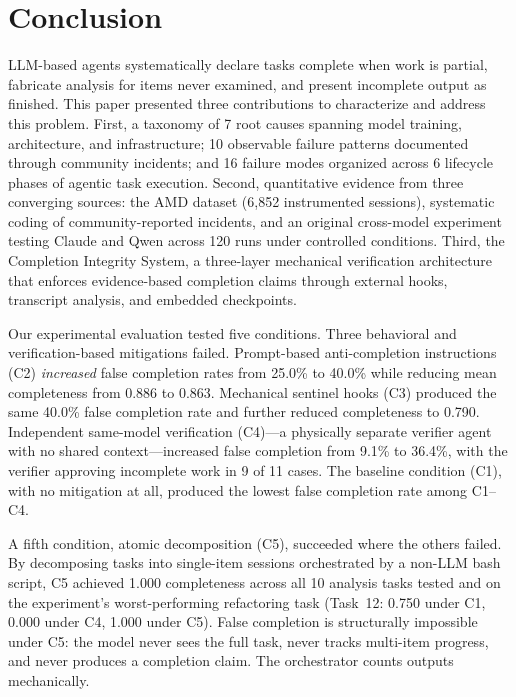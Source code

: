 \section{Conclusion}
\label{sec:conclusion}

LLM-based agents systematically declare tasks complete when work is partial, fabricate analysis for items never examined, and present incomplete output as finished.
This paper presented three contributions to characterize and address this problem.
First, a taxonomy of 7 root causes spanning model training, architecture, and infrastructure; 10 observable failure patterns documented through community incidents; and 16 failure modes organized across 6 lifecycle phases of agentic task execution.
Second, quantitative evidence from three converging sources: the AMD dataset (6,852 instrumented sessions), systematic coding of community-reported incidents, and an original cross-model experiment testing Claude and Qwen across 120 runs under controlled conditions.
Third, the Completion Integrity System, a three-layer mechanical verification architecture that enforces evidence-based completion claims through external hooks, transcript analysis, and embedded checkpoints.

Our experimental evaluation tested five conditions.
Three behavioral and verification-based mitigations failed.
Prompt-based anti-completion instructions (C2) \emph{increased} false completion rates from 25.0\% to 40.0\% while reducing mean completeness from 0.886 to 0.863.
Mechanical sentinel hooks (C3) produced the same 40.0\% false completion rate and further reduced completeness to 0.790.
Independent same-model verification (C4)---a physically separate verifier agent with no shared context---increased false completion from 9.1\% to 36.4\%, with the verifier approving incomplete work in 9 of 11 cases.
The baseline condition (C1), with no mitigation at all, produced the lowest false completion rate among C1--C4.

A fifth condition, atomic decomposition (C5), succeeded where the others failed.
By decomposing tasks into single-item sessions orchestrated by a non-LLM bash script, C5 achieved 1.000 completeness across all 10 analysis tasks tested and on the experiment's worst-performing refactoring task (Task~12: 0.750 under C1, 0.000 under C4, 1.000 under C5).
False completion is structurally impossible under C5: the model never sees the full task, never tracks multi-item progress, and never produces a completion claim.
The orchestrator counts outputs mechanically.

